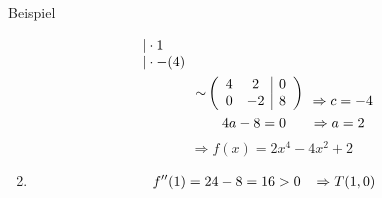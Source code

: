 \documentclass{article}
\begin{document}
\begin{boxx}[DarkBlue]{Beispiel}
\begin{enumerate}
\begin{align*}
\begin{array}{ll}
                |\cdot 1 & \\
                |\cdot -(4)&
            \end{array} \\
            \sim&\left( \begin{array}{cc|c} 4 & 2 & 0 \\ 0 & -2 & 8 \end{array} \right) \begin{array}{ll}
                & \\
                \Rightarrow c = -4&
            \end{array}\\
            &\hspace*{4mm}4a -8 = 0 \hspace*{6mm}\Rightarrow a = 2
        \end{align*}
        \[\Rightarrow f(x) = 2x^4 - 4x^2 + 2\]
        \item \begin{align*}
            f''(1) &= 24-8 = 16 > 0 \hspace*{3mm}\Rightarrow T(1, 0)
        \end{align*}
    \end{enumerate}
\end{boxx}
\end{document}
